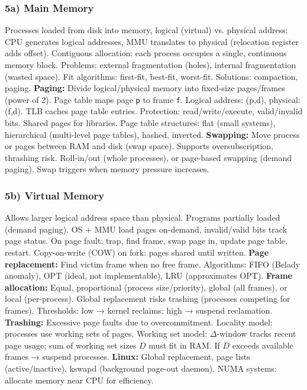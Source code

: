\subsubsection*{5a) Main Memory}
Processes loaded from disk into memory, logical (virtual) vs. physical address: CPU generates logical addresses, MMU translates to physical (relocation register adds offset). Contiguous allocation: each process occupies a single, continuous memory block. Problems: external fragmentation (holes), internal fragmentation (wasted space). Fit algorithms: first-fit, best-fit, worst-fit. Solutions: compaction, paging.  
\textbf{Paging:} Divide logical/physical memory into fixed-size pages/frames (power of 2). Page table maps page \texttt{p} to frame \texttt{f}. Logical address: (p,d), physical: (f,d). TLB caches page table entries. Protection: read/write/execute, valid/invalid bits. Shared pages for libraries. Page table structures: flat (small systems), hierarchical (multi-level page tables), hashed, inverted.  
\textbf{Swapping:} Move process or pages between RAM and disk (swap space). Supports oversubscription, thrashing risk. Roll-in/out (whole processes), or page-based swapping (demand paging). Swap triggers when memory pressure increases.

\subsubsection*{5b) Virtual Memory}
Allows larger logical address space than physical. Programs partially loaded (demand paging). OS + MMU load pages on-demand, invalid/valid bits track page status. On page fault: trap, find frame, swap page in, update page table, restart. Copy-on-write (COW) on fork: pages shared until written.  
\textbf{Page replacement:} Find victim frame when no free frame. Algorithms: FIFO (Belady anomaly), OPT (ideal, not implementable), LRU (approximates OPT).  
\textbf{Frame allocation:} Equal, proportional (process size/priority), global (all frames), or local (per-process). Global replacement risks trashing (processes competing for frames). Thresholds: low → kernel reclaims; high → suspend reclamation.  
\textbf{Trashing:} Excessive page faults due to overcommitment. Locality model: processes use working sets of pages. Working set model: \(\Delta\)-window tracks recent page usage; sum of working set sizes \(D\) must fit in RAM. If \(D\) exceeds available frames → suspend processes.  
\textbf{Linux:} Global replacement, page lists (active/inactive), kswapd (background page-out daemon). NUMA systems: allocate memory near CPU for efficiency.